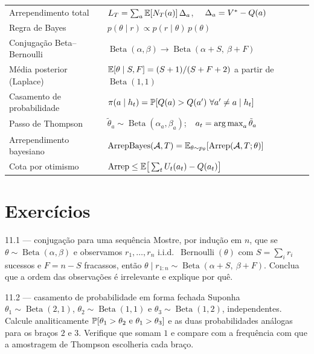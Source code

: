 \documentclass[11pt, a4paper]{article}
\newcommand{\arrep}{\mathrm{Arrep}}
\newcommand{\arrepb}{\mathrm{ArrepBayes}}
\newcommand{\alg}{\mathcal{A}}
\newcommand{\Bdist}{\operatorname{Beta}}
\newcommand{\Bern}{\operatorname{Bernoulli}}
\newcommand{\hist}{h_t}
\begin{document}
\begin{center}\small
\begin{tabular}{@{}ll@{}}
\toprule
Arrependimento total & $L_T = \sum_a \mathbb{E}[N_T(a)]\,\Delta_a$, \ \ $\Delta_a = V^{*} - Q(a)$ \\
Regra de Bayes & $p(\theta\mid r) \propto p(r\mid\theta)\,p(\theta)$ \\
Conjugação Beta--Bernoulli & $\Bdist(\alpha,\beta) \to \Bdist(\alpha+S,\ \beta+F)$ \\
Média posterior (Laplace) & $\mathbb{E}[\theta\mid S,F] = (S+1)/(S+F+2)$ a partir de $\Bdist(1,1)$ \\
Casamento de probabilidade & $\pol(a\mid \hist) = \Prob[Q(a) > Q(a')\ \forall a' \neq a \mid \hist]$ \\
Passo de Thompson & $\tilde\theta_a \sim \Bdist(\alpha_a,\beta_a)$;\ \ $a_t = \operatorname*{arg\,max}_a \tilde\theta_a$ \\
Arrependimento bayesiano & $\arrepb(\alg,T) = \E_{\theta\sim p_\theta}[\arrep(\alg,T;\theta)]$ \\
Cota por otimismo & $\arrep \le \E\big[\sum_t U_t(a_t) - Q(a_t)\big]$ \\
\bottomrule
\end{tabular}
\end{center}

\section{Exercícios}

\begin{exbox}{11.1 — conjugação para uma sequência}
Mostre, por indução em $n$, que se $\theta \sim \Bdist(\alpha,\beta)$ e
observamos $r_1,\ldots,r_n$ i.i.d.\ $\Bern(\theta)$ com $S = \sum_i r_i$
sucessos e $F = n - S$ fracassos, então
$\theta \mid r_{1:n} \sim \Bdist(\alpha+S,\ \beta+F)$. Conclua que a ordem das
observações é irrelevante e explique por quê.
\end{exbox}

\begin{exbox}{11.2 — casamento de probabilidade em forma fechada}
Suponha $\theta_1 \sim \Bdist(2,1)$, $\theta_2 \sim \Bdist(1,1)$ e
$\theta_3 \sim \Bdist(1,2)$, independentes. Calcule analiticamente
$\mathbb{P}[\theta_1 > \theta_2 \text{ e } \theta_1 > \theta_3]$ e as duas
probabilidades análogas para os braços $2$ e $3$. Verifique que somam $1$ e
compare com a frequência com que a amostragem de Thompson escolheria cada braço.
\end{exbox}
\end{document}

